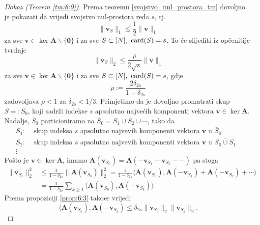\documentclass[a4paper,twoside,12pt]{memoir} %
\newcommand{\vect}[1]{\mathbf{#1}}
\renewcommand{\vec}{\vect}
\newcommand{\card}{\text{\normalfont{card}}}
\newcommand{\norm}[1]{\|{#1}\|}
\begin{document}
\begin{proof}[Dokaz (Teorem \ref{tm:6:9})]
    Prema teoremu \ref{svojstvo_nul_prostora_tm} dovoljno je pokazati da vrijedi svojstvo nul-prostora reda $s$, tj.
    \begin{equation*}
        \norm{\vec v_S}_1 \leq \frac{1}{2} \norm{\vec v}_1     
    \end{equation*}
    za sve $\vec v \in \ker \vec A \backslash \{\vec 0\}$ i za sve $S \subset [N],\  \card(S) = s$. To \'ce slijediti iz op\v{c}enitije tvrdnje  
    \begin{equation*}
        \norm{\vec v_S}_2 \leq \frac{\rho}{2 \sqrt{s}} \norm{\vec v}_1     
    \end{equation*}
    za sve $\vec v \in \ker \vec A \backslash \{\vec 0\}$ i za sve $S \subset [N],\  \card(S) = s$, gdje
    \begin{equation*}
        \rho := \frac{2 \delta_{2s}}{1 - \delta_{2s}}  
    \end{equation*}
    zadovoljava $\rho < 1$ za $\delta_{2s} < 1/3$.
    Primjetimo da je dovoljno promatrati skup $S =: S_0$, koji sadr\v{z}i indekse $s$ apsolutno najve\'cih komponenti vektora $\vec v \in \ker \vec A$. Nadalje, $\bar S_0$ particioniramo na $\bar S_0 = S_1 \cup S_2 \cup \cdots$, tako da
    \begin{align*}
       S_1:& \text{ skup indeksa $s$ apsolutno najve\'vih komponenti vektora $\vec v$ u $\bar S_0$}\\ 
       S_2:& \text{ skup indeksa $s$ apsolutno najve\'vih komponenti vektora $\vec v$ u $\overline{S_0 \cup S_1}$ }\\
       \vdots &
    \end{align*}
    Po\v{s}to je $\vec v \in \ker \vec A$, imamo $\vec A(\vec v_{S_0}) = \vec A(-\vec v_{S_1} - \vec v_{S_2} - \cdots)$ pa stoga
    \begin{align}
        \norm{\vec v_{S_0}}^2_2 &\leq \frac{1}{1- \delta_{2s}} \norm{\vec A(\vec v_{S_0})}^2_2 = \frac{1}{1-\delta_{2s}} \langle \vec A(\vec v_{S_0}), \vec A(-\vec v_{S_1}) + \vec A (- \vec v_{S_2}) + \cdots \rangle \nonumber \\
        &= \frac{1}{1-\delta_{2s}} \sum_{k \geq 1} \langle \vec A(\vec v_{S_0}), \vec A (- \vec v_{S_k}) \rangle \label{6:18}
    \end{align}
    Prema propoziciji \ref{prop:6:3} tako\dj er vrijedi
    \begin{equation}\label{6:19}
        \langle \vec A (\vec v_{S_0}), \vec A (-\vec v_{S_k})  \leq \delta_{2s} \norm{\vec v_{S_0}}_2 \norm{\vec v_{S_k}}_2.

\end{equation}
\end{proof}
\end{document}
